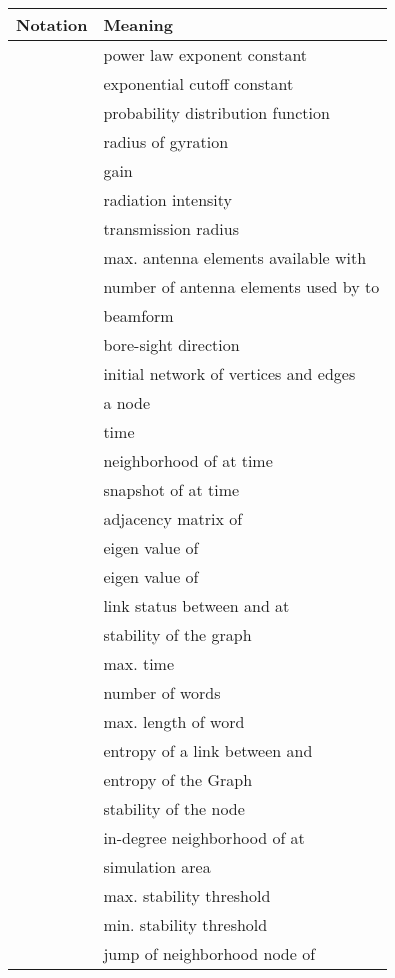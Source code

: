 \documentclass[preprint, twocolumn,5p]{elsarticle}
\begin{document}
\begin{table}[!htb]
\centering
    \begin{tabular}{|l|l|}
        \hline
        \textbf{Notation} & \textbf{Meaning}\\
        \hline
         & power law exponent constant\\
         & exponential cutoff constant\\
         & probability distribution function\\
         & radius of gyration\\
         & gain\\
         & radiation intensity\\
         & transmission radius\\
         & max. antenna elements available with \\
         & number of antenna elements used by  to \\
            & beamform \\
         & bore-sight direction\\
         & initial network of  vertices and  edges\\
         & a node \\
         & time\\
         & neighborhood of  at time \\
         & snapshot of  at time \\
         & adjacency matrix of \\
        &  eigen value of \\
        &  eigen value of \\
         & link status between  and  at \\
         & stability of the graph\\
         & max. time\\
         & number of words\\
         & max. length of word\\
         & entropy of a link between  and \\
         & entropy of the Graph \\
         & stability of the node \\
         & in-degree neighborhood of  at \\
         & simulation area\\
         & max. stability threshold\\
         & min. stability threshold\\
         & jump of neighborhood node of \\

\end{tabular}
\end{table}
\end{document}
